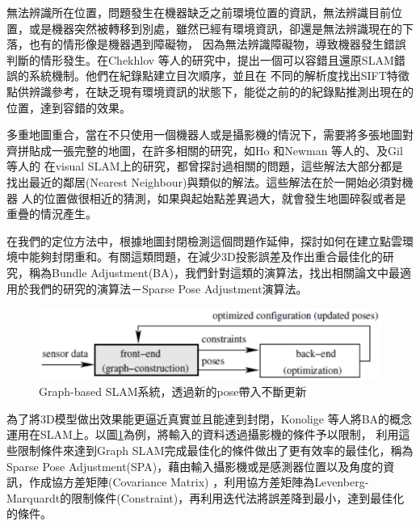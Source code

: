 	無法辨識所在位置，問題發生在機器缺乏之前環境位置的資訊，無法辨識目前位置，或是機器突然被轉移到別處，雖然已經有環境資訊，卻還是無法辨識現在的下落，也有的情形像是機器遇到障礙物，
因為無法辨識障礙物，導致機器發生錯誤判斷的情形發生。在Chekhlov 等人的研究中\cite{Chekhlov2008}，提出一個可以容錯且還原SLAM錯誤的系統機制。他們在紀錄點建立目次順序，並且在
不同的解析度找出SIFT特徵點供辨識參考，在缺乏現有環境資訊的狀態下，能從之前的的紀錄點推測出現在的位置，達到容錯的效果。

	多重地圖重合，當在不只使用一個機器人或是攝影機的情況下，需要將多張地圖對齊拼貼成一張完整的地圖，在許多相關的研究，如Ho 和Newman 等人的\cite{Ho2007}、及Gil 等人的
\cite{Gil2010}在visual SLAM上的研究，都曾探討過相關的問題，這些解法大部分都是找出最近的鄰居(Nearest Neighbour)與類似的解法。這些解法在於一開始必須對機器
人的位置做很相近的猜測，如果與起始點差異過大，就會發生地圖碎裂或者是重疊的情況產生。

	在我們的定位方法中，根據地圖封閉檢測這個問題作延伸，探討如何在建立點雲環境中能夠封閉重和。有關這類問題，在減少3D投影誤差及作出重合最佳化的研究，稱為Bundle 
Adjustment(BA)\cite{Triggs2000}，我們針對這類的演算法，找出相關論文中最適用於我們的研究的演算法－Sparse Pose Adjustment演算法。

\begin{figure}
\begin{center}
  \includegraphics[width=1.0\textwidth]{figures/Graph-based_SLAM.eps}
  \caption{Graph-based SLAM系統，透過新的pose帶入不斷更新}
  \label{fig:RGB-D System}
\end{center}

\end{figure}  

	為了將3D模型做出效果能更逼近真實並且能達到封閉，Konolige 等人將BA的概念運用在SLAM上\cite{Konolige2010}。以圖\ref{fig:RGB-D System}為例，將輸入的資料透過攝影機的條件予以限制，
利用這些限制條件來達到Graph SLAM完成最佳化的條件做出了更有效率的最佳化，稱為Sparse Pose Adjustment(SPA)，藉由輸入攝影機或是感測器位置以及角度的資訊，作成協方差矩陣(Covariance Matrix)
，利用協方差矩陣為Levenberg-Marquardt的限制條件(Constraint)，再利用迭代法將誤差降到最小，達到最佳化的條件。

